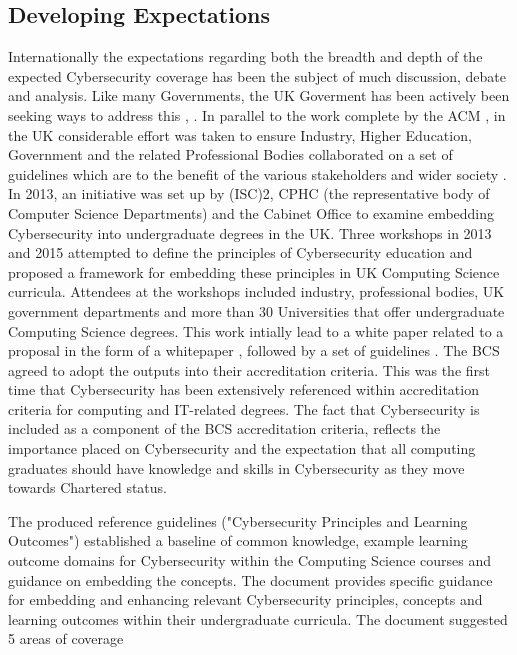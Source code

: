 \documentclass[conference]{IEEEtran}
\begin{document}
\subsection{Developing Expectations}
Internationally the expectations regarding both the breadth and depth of the expected Cybersecurity coverage has been the subject of much discussion, debate and analysis. Like many Governments, the UK Goverment has been actively been seeking ways to address this \cite{UKCabinetOffice}, \cite{UKCabinetOffice2014}. In parallel to the work complete by the ACM \cite{ACM2013a}, in the UK considerable effort was taken to ensure Industry, Higher Education, Government and the related Professional Bodies collaborated on a set of guidelines which are to the benefit of the various stakeholders and wider society \cite{Irons2016}. In 2013, an initiative was set up by (ISC)2, CPHC (the representative body of Computer Science Departments) and the Cabinet Office to examine embedding Cybersecurity into undergraduate degrees in the UK. Three workshops in 2013 and 2015 attempted to define the principles of Cybersecurity education and proposed a framework for embedding these principles in UK Computing Science curricula. Attendees at the workshops included industry, professional bodies, UK government departments and more than 30 Universities that offer undergraduate Computing Science degrees. This work intially lead to a white paper related to a proposal in the form of a whitepaper \cite{CPHCISC2014}, followed by a set of guidelines \cite{CPHCISC2}. The BCS agreed to adopt the outputs into their accreditation criteria. This was the first time that Cybersecurity has been extensively referenced within accreditation criteria for computing and IT-related degrees. The fact that Cybersecurity is included as a  component of the BCS accreditation criteria, reflects the importance placed on Cybersecurity and the expectation that all computing graduates should have knowledge and skills in Cybersecurity as they move towards Chartered status.

The produced reference guidelines ("Cybersecurity Principles and Learning Outcomes") \cite{CPHCISC2} established a baseline of common knowledge, example learning outcome domains for Cybersecurity within the Computing Science courses and guidance on embedding the concepts. The document provides specific guidance for embedding and enhancing relevant Cybersecurity principles, concepts and learning outcomes within their undergraduate curricula. The document suggested 5 areas of coverage 
\end{document}
